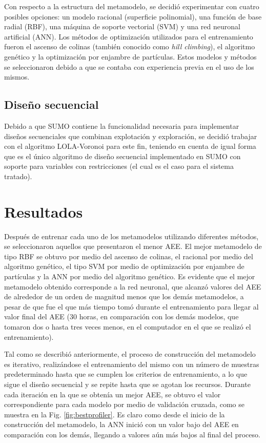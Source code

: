 Con respecto a la estructura del metamodelo, se decidió experimentar con cuatro posibles opciones: un modelo racional (superficie polinomial), una función de base radial (RBF), una máquina de soporte vectorial (SVM) y una red neuronal artificial (ANN). Los métodos de optimización utilizados para el entrenamiento fueron el ascenso de colinas (también conocido como \textit{hill climbing}), el algoritmo genético y la optimización por enjambre de partículas. Estos modelos y métodos se seleccionaron debido a que se contaba con experiencia previa en el uso de los mismos.

\subsection{Diseño secuencial}
Debido a que SUMO contiene la funcionalidad necesaria para implementar diseños secuenciales que combinan explotación y exploración, se decidió trabajar con el algoritmo LOLA-Voronoi para este fin, teniendo en cuenta de igual forma que es el único algoritmo de diseño secuencial implementado en SUMO con soporte para variables con restricciones (el cual es el caso para el sistema tratado).

\section{Resultados}
Después de entrenar cada uno de los metamodelos utilizando diferentes métodos, se seleccionaron aquellos que presentaron el menor AEE. El mejor metamodelo de tipo RBF se obtuvo por medio del ascenso de colinas, el racional por medio del algoritmo genético, el tipo SVM por medio de optimización por enjambre de partículas y la ANN por medio del algoritmo genético. Es evidente que el mejor metamodelo obtenido corresponde a la red neuronal, que alcanzó valores del AEE de alrededor de un orden de magnitud menos que los demás metamodelos, a pesar de que fue el que más tiempo tomó durante el entrenamiento para llegar al valor final del AEE (30 horas, en comparación con los demás modelos, que tomaron dos o hasta tres veces menos, en el computador en el que se realizó el entrenamiento).

Tal como se describió anteriormente, el proceso de construcción del metamodelo es iterativo, realizándose el entrenamiento del mismo con un número de muestras predeterminado hasta que se cumplen los criterios de entrenamiento, a lo que sigue el diseño secuencial y se repite hasta que se agotan los recursos. Durante cada iteración en la que se obtenía un mejor AEE, se obtuvo el valor correspondiente para cada modelo por medio de validación cruzada, como se muestra en la Fig. \ref{fig:bestprofiler}. Es claro como desde el inicio de la construcción del metamodelo, la ANN inició con un valor bajo del AEE en comparación con los demás, llegando a valores aún más bajos al final del proceso.

